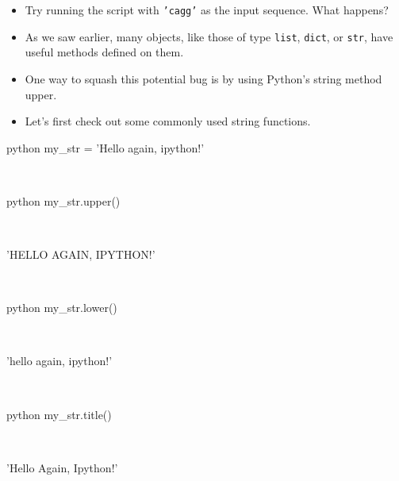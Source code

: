 \documentclass[aspectratio=1610,slidestop]{beamer}
\begin{document}
\begin{pframe}

 \begin{itemize}
  \vspace{-0.8cm}
  \item Try running the script with \texttt{'cagg'} as the input
  sequence. What happens?
  \item As we saw earlier, many objects, like those of type
  \texttt{list}, \texttt{dict}, or
  \texttt{str}, have useful methods defined on them.
  \item One way to squash this potential bug is by using Python's string method
  upper.
  \item Let's first check out some commonly used string functions.
 \end{itemize}

 \begin{ipython}
   \begin{pythonin}{python}
my_str = 'Hello again, ipython!'
   \end{pythonin}
   \\
   \begin{pythonin}{python}
my_str.upper()
   \end{pythonin}
   \\
   \begin{pythonout}
'HELLO AGAIN, IPYTHON!'
   \end{pythonout}
   \\

   \begin{pythonin}{python}
my_str.lower()
   \end{pythonin}
   \\
   \begin{pythonout}
'hello again, ipython!'
   \end{pythonout}
   \\

   \begin{pythonin}{python}
my_str.title()
   \end{pythonin}
   \\
   \begin{pythonout}
'Hello Again, Ipython!'
   \end{pythonout}
  \end{ipython}
\end{pframe}
\end{document}
